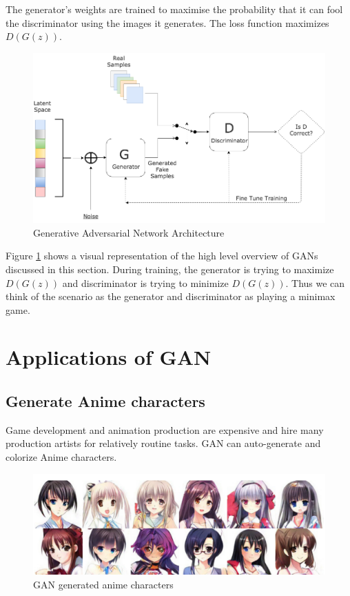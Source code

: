 \begin{onehalfspace}
    The generator's weights are trained to maximise the probability that it can 
    fool the discriminator using the images it generates. The loss function 
    maximizes \(D(G(z))\).

    \begin{figure}[h]
        \centering
        \includegraphics[width=0.8\linewidth]{generative-adversarial-network.png}
        \caption{Generative Adversarial Network Architecture}
        \label{fig:gans}
    \end{figure} 

    Figure \ref{fig:gans} shows a visual representation of the high level 
    overview of GANs discussed in this section.
    During training, the generator is trying to maximize \(D(G(z))\) and 
    discriminator is trying to minimize \(D(G(z))\).  Thus we can think of the 
    scenario as the generator and discriminator as playing a minimax game.
\section{Applications of GAN}
    \subsection{Generate Anime characters}
    Game development and animation production are expensive and hire many production artists for relatively routine tasks. GAN can auto-generate and colorize Anime characters.
    \begin{figure}[h]
        \centering
        \includegraphics[width=0.8\linewidth]{animecharacter.png}
        \caption{GAN generated anime characters}
    \end{figure} 


\end{onehalfspace}
